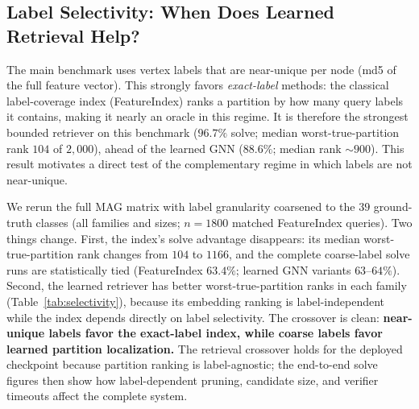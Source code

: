 \documentclass[runningheads]{llncs}
\begin{document}
\subsection{Label Selectivity: When Does Learned Retrieval Help?}
\label{sec:selectivity}

The main benchmark uses vertex labels that are near-unique per node (md5 of the full feature vector). This strongly favors \emph{exact-label} methods: the classical label-coverage index (FeatureIndex) ranks a partition by how many query labels it contains, making it nearly an oracle in this regime. It is therefore the strongest bounded retriever on this benchmark ($96.7\%$ solve; median worst-true-partition rank $104$ of $2{,}000$), ahead of the learned GNN ($88.6\%$; median rank ${\sim}900$). This result motivates a direct test of the complementary regime in which labels are not near-unique.

We rerun the full MAG matrix with label granularity coarsened to the $39$ ground-truth classes (all families and sizes; $n{=}1800$ matched FeatureIndex queries). Two things change. First, the index's solve advantage disappears: its median worst-true-partition rank changes from $104$ to $1166$, and the complete coarse-label solve runs are statistically tied (FeatureIndex $63.4\%$; learned GNN variants $63$--$64\%$). Second, the learned retriever has better worst-true-partition ranks in each family (Table~\ref{tab:selectivity}), because its embedding ranking is label-independent while the index depends directly on label selectivity. The crossover is clean: \textbf{near-unique labels favor the exact-label index, while coarse labels favor learned partition localization.} The retrieval crossover holds for the deployed checkpoint because partition ranking is label-agnostic; the end-to-end solve figures then show how label-dependent pruning, candidate size, and verifier timeouts affect the complete system.
\end{document}
